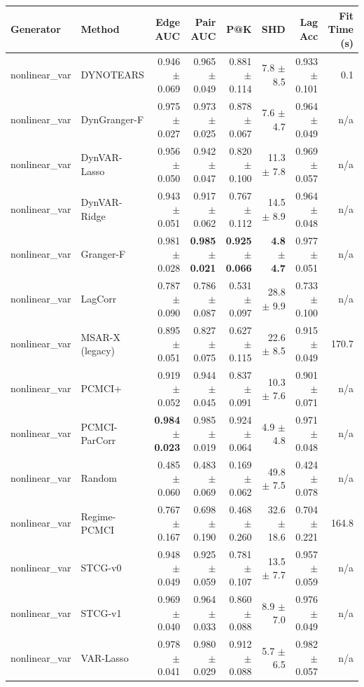 \begin{tabular}{llrrrrrr}
\toprule
Generator & Method & Edge AUC & Pair AUC & P@K & SHD & Lag Acc & Fit Time (s) \\
\midrule
nonlinear\_var & DYNOTEARS & 0.946 $\pm$ 0.069 & 0.965 $\pm$ 0.049 & 0.881 $\pm$ 0.114 & 7.8 $\pm$ 8.5 & 0.933 $\pm$ 0.101 & 0.1 \\
nonlinear\_var & DynGranger-F & 0.975 $\pm$ 0.027 & 0.973 $\pm$ 0.025 & 0.878 $\pm$ 0.067 & 7.6 $\pm$ 4.7 & 0.964 $\pm$ 0.049 & n/a \\
nonlinear\_var & DynVAR-Lasso & 0.956 $\pm$ 0.050 & 0.942 $\pm$ 0.047 & 0.820 $\pm$ 0.100 & 11.3 $\pm$ 7.8 & 0.969 $\pm$ 0.057 & n/a \\
nonlinear\_var & DynVAR-Ridge & 0.943 $\pm$ 0.051 & 0.917 $\pm$ 0.062 & 0.767 $\pm$ 0.112 & 14.5 $\pm$ 8.9 & 0.964 $\pm$ 0.048 & n/a \\
nonlinear\_var & Granger-F & 0.981 $\pm$ 0.028 & \textbf{0.985 $\pm$ 0.021} & \textbf{0.925 $\pm$ 0.066} & \textbf{4.8 $\pm$ 4.7} & 0.977 $\pm$ 0.051 & n/a \\
nonlinear\_var & LagCorr & 0.787 $\pm$ 0.090 & 0.786 $\pm$ 0.087 & 0.531 $\pm$ 0.097 & 28.8 $\pm$ 9.9 & 0.733 $\pm$ 0.100 & n/a \\
nonlinear\_var & MSAR-X (legacy) & 0.895 $\pm$ 0.051 & 0.827 $\pm$ 0.075 & 0.627 $\pm$ 0.115 & 22.6 $\pm$ 8.5 & 0.915 $\pm$ 0.049 & 170.7 \\
nonlinear\_var & PCMCI+ & 0.919 $\pm$ 0.052 & 0.944 $\pm$ 0.045 & 0.837 $\pm$ 0.091 & 10.3 $\pm$ 7.6 & 0.901 $\pm$ 0.071 & n/a \\
nonlinear\_var & PCMCI-ParCorr & \textbf{0.984 $\pm$ 0.023} & 0.985 $\pm$ 0.019 & 0.924 $\pm$ 0.064 & 4.9 $\pm$ 4.8 & 0.971 $\pm$ 0.048 & n/a \\
nonlinear\_var & Random & 0.485 $\pm$ 0.060 & 0.483 $\pm$ 0.069 & 0.169 $\pm$ 0.062 & 49.8 $\pm$ 7.5 & 0.424 $\pm$ 0.078 & n/a \\
nonlinear\_var & Regime-PCMCI & 0.767 $\pm$ 0.167 & 0.698 $\pm$ 0.190 & 0.468 $\pm$ 0.260 & 32.6 $\pm$ 18.6 & 0.704 $\pm$ 0.221 & 164.8 \\
nonlinear\_var & STCG-v0 & 0.948 $\pm$ 0.049 & 0.925 $\pm$ 0.059 & 0.781 $\pm$ 0.107 & 13.5 $\pm$ 7.7 & 0.957 $\pm$ 0.059 & n/a \\
nonlinear\_var & STCG-v1 & 0.969 $\pm$ 0.040 & 0.964 $\pm$ 0.033 & 0.860 $\pm$ 0.088 & 8.9 $\pm$ 7.0 & 0.976 $\pm$ 0.049 & n/a \\
nonlinear\_var & VAR-Lasso & 0.978 $\pm$ 0.041 & 0.980 $\pm$ 0.029 & 0.912 $\pm$ 0.088 & 5.7 $\pm$ 6.5 & 0.982 $\pm$ 0.057 & n/a \\

\end{tabular}
